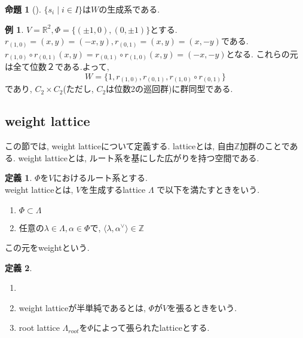 \documentclass[
  a4paper, 
  12pt,
  ja=standard,
  xelatex,
  left=30truemm,
  right=30truemm,
  titlepage 
]{bxjsarticle}
\theoremstyle{definition}
\newtheorem{df}{定義}
\newtheorem{prop}[thm]{命題}
\newtheorem*{ex}{例}
\begin{document}
\begin{prop} [{\cite[命題2.3]{b1}}]
  $\{ s_i \mid i \in I \}$は$W$の生成系である. 
\end{prop}

\begin{ex}
  $V = \mathbb{R}^2, \Phi = \{ (\pm 1, 0), (0, \pm 1) \}$とする. \\
  $r_{ (1, 0)} =(x, y) = (-x, y), r_{ (0 ,1)} =(x, y) = (x, -y)$である.
  $r_{ (1, 0)} \circ r_{ (0 ,1)}(x, y) = r_{ (0, 1)} \circ r_{ (1 ,0)}(x, y) = (-x, -y)$となる.
  これらの元は全て位数２である.よって, 
  $$ W = \{ 1, r_{ (1, 0)}, r_{ (0 ,1)}, r_{ (1, 0)} \circ r_{ (0 ,1)} \}$$
  であり, $C_2 \times C_2 $(ただし, $C_2$は位数2の巡回群)に群同型である.
\end{ex}

\subsection{weight lattice}
  この節では, weight latticeについて定義する. latticeとは, 自由$\mathbb{Z}$加群のことである.
  weight latticeとは, ルート系を基にした広がりを持つ空間である. 
\bigskip

\begin{df}
  $\Phi$を$V$におけるルート系とする. \\
  weight latticeとは, $V$を生成するlattice $\Lambda$ で以下を満たすときをいう.
  \begin{enumerate}
    \item $\Phi \subset \Lambda $
    \item 任意の$ \lambda \in \Lambda, \alpha \in \Phi $で, $ \langle \lambda, \alpha^{ \vee } \rangle \in \mathbb{Z} $
  \end{enumerate}
  この元をweightという.
\end{df}

\begin{df}
  \begin{enumerate}
    \item[]
    \item weight latticeが半単純であるとは, $\Phi$が$V$を張るときをいう.
    \item root lattice $\Lambda_{ root }$を$\Phi$によって張られたlatticeとする.
  \end{enumerate}
\end{df}
\end{document}
